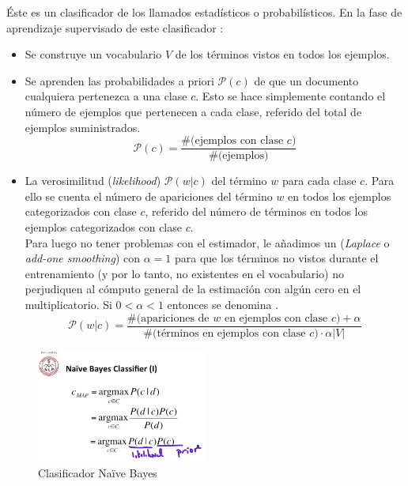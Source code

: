 Éste es un clasificador de los llamados estadísticos o probabilísticos. En la fase de aprendizaje supervisado de este clasificador \citep{Jurafsky2015}:
\begin{itemize}
\item Se construye un vocabulario $V$ de los términos vistos en todos los ejemplos.
\item Se aprenden las probabilidades a priori $\mathcal{P}(c)$ de que un documento cualquiera pertenezca a una clase $c$. Esto se hace simplemente contando el número de ejemplos que pertenecen a cada clase, referido del total de ejemplos suministrados.
\begin{equation}
\mathcal{P}(c) = \frac{\text{\#(ejemplos con clase $c$)}}{\text{\#(ejemplos)}}
\end{equation}
\item La verosimilitud (\emph{likelihood}) $\mathcal{P}(w|c)$ del término $w$ para cada clase $c$. Para ello se cuenta el número de apariciones del término $w$ en todos los ejemplos categorizados con clase $c$, referido del número de términos en todos los ejemplos categorizados con clase $c$.\\
Para luego no tener problemas con el estimador, le añadimos un  (\emph{Laplace} o \emph{add-one smoothing}) con $\alpha = 1$ para que los términos no vistos durante el entrenamiento (y por lo tanto, no existentes en el vocabulario) no perjudiquen al cómputo general de la estimación con algún cero en el multiplicatorio. Si $0 < \alpha < 1$ entonces se denomina  \citep{Pedregosa2011}.
\begin{equation}
\mathcal{P}(w|c) = \frac{\text{\#(apariciones de $w$ en ejemplos con clase $c$)} + \alpha}%
{\text{\#(términos en ejemplos con clase $c$)} \cdot \alpha |V|}
\end{equation}
\end{itemize}

\begin{figure}[htbp]
\centering
\includegraphics[width=0.5\textwidth]{multinomialNB-clsfy}
\caption[Clasificador Naïve Bayes]{Clasificador Naïve Bayes \citep{Jurafsky2015}}
\label{fig:multinomialNB-clsfy}
\end{figure}

